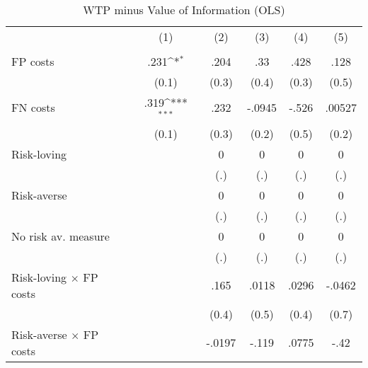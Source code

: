 \begin{table}[htbp]\centering
\def\sym#1{\ifmmode^{#1}\else\(^{#1}\)\fi}
\caption{WTP minus Value of Information (OLS)}
\begin{tabular}{l*{5}{c}}
\hline\hline
                &\multicolumn{1}{c}{(1)}&\multicolumn{1}{c}{(2)}&\multicolumn{1}{c}{(3)}&\multicolumn{1}{c}{(4)}&\multicolumn{1}{c}{(5)}\\
                &\multicolumn{1}{c}{}&\multicolumn{1}{c}{}&\multicolumn{1}{c}{}&\multicolumn{1}{c}{}&\multicolumn{1}{c}{}\\
\hline
FP costs        &     .231\sym{*}  &     .204         &      .33         &     .428         &     .128         \\
                &    (0.1)         &    (0.3)         &    (0.4)         &    (0.3)         &    (0.5)         \\
FN costs        &     .319\sym{***}&     .232         &   -.0945         &    -.526         &   .00527         \\
                &    (0.1)         &    (0.3)         &    (0.2)         &    (0.5)         &    (0.2)         \\
Risk-loving     &                  &        0         &        0         &        0         &        0         \\
                &                  &      (.)         &      (.)         &      (.)         &      (.)         \\
Risk-averse     &                  &        0         &        0         &        0         &        0         \\
                &                  &      (.)         &      (.)         &      (.)         &      (.)         \\
No risk av. measure&                  &        0         &        0         &        0         &        0         \\
                &                  &      (.)         &      (.)         &      (.)         &      (.)         \\
Risk-loving $\times$ FP costs&                  &     .165         &    .0118         &    .0296         &   -.0462         \\
                &                  &    (0.4)         &    (0.5)         &    (0.4)         &    (0.7)         \\
Risk-averse $\times$ FP costs&                  &   -.0197         &    -.119         &    .0775         &     -.42         \\

\end{tabular}
\end{table}
